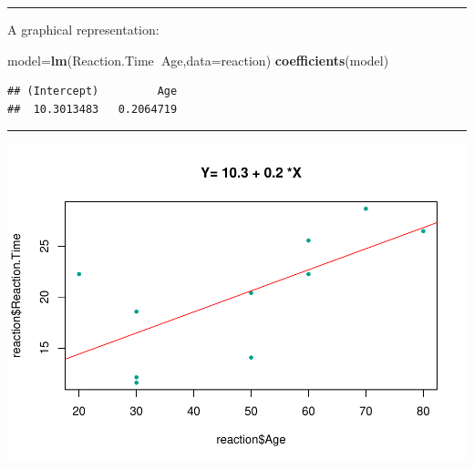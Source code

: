 \documentclass[]{article}
\newenvironment{Shaded}{\begin{snugshade}}{\end{snugshade}}
\newcommand{\KeywordTok}[1]{\textcolor[rgb]{0.13,0.29,0.53}{\textbf{#1}}}
\newcommand{\DataTypeTok}[1]{\textcolor[rgb]{0.13,0.29,0.53}{#1}}
\newcommand{\DecValTok}[1]{\textcolor[rgb]{0.00,0.00,0.81}{#1}}
\newcommand{\StringTok}[1]{\textcolor[rgb]{0.31,0.60,0.02}{#1}}
\newcommand{\OperatorTok}[1]{\textcolor[rgb]{0.81,0.36,0.00}{\textbf{#1}}}
\newcommand{\NormalTok}[1]{#1}
\begin{document}
\begin{center}\rule{0.5\linewidth}{\linethickness}\end{center}

A graphical representation:

\begin{Shaded}
\begin{Highlighting}[]
\NormalTok{model=}\KeywordTok{lm}\NormalTok{(Reaction.Time}\OperatorTok{~}\NormalTok{Age,}\DataTypeTok{data=}\NormalTok{reaction)}
\KeywordTok{coefficients}\NormalTok{(model)}
\end{Highlighting}
\end{Shaded}

\begin{verbatim}
## (Intercept)         Age 
##  10.3013483   0.2064719
\end{verbatim}

\begin{center}\rule{0.5\linewidth}{\linethickness}\end{center}

\begin{Shaded}
\end{Shaded}

\begin{center}\includegraphics{inference_booklet_files/figure-latex/unnamed-chunk-6-1} \end{center}
\end{document}
